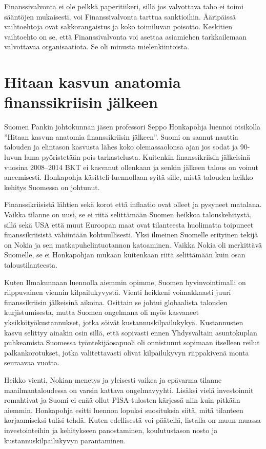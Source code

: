 \documentclass[12pt]{article}
\begin{document}
Finanssivalvonta ei ole pelkkä paperitiikeri, sillä jos valvottava taho ei toimi sääntöjen mukaisesti, voi Finanssivalvonta tarttua sanktioihin. Ääripäissä vaihtoehtoja ovat sakkorangaistus ja koko toimiluvan poisotto. Keskitien vaihtoehto on se, että Finanssivalvonta voi asettaa asiamiehen tarkkailemaan valvottavaa organisaatiota. Se oli minusta mielenkiintoista.


\newpage
\section{Hitaan kasvun anatomia finanssikriisin jälkeen}

Suomen Pankin johtokunnan jäsen professori Seppo Honkapohja luennoi otsikolla ''Hitaan kasvun anatomia finanssikriisin jälkeen''. Suomi on saanut nauttia talouden ja elintason kasvusta lähes koko olemassaolonsa ajan jos sodat ja 90-luvun lama pyöristetään pois tarkastelusta. Kuitenkin finanssikriisin jälkeisinä vuosina 2008--2014 BKT ei kasvanut ollenkaan ja senkin jälkeen talous on voinut aneemisesti. Honkapohja käsitteli luennollaan syitä sille, mistä talouden heikko kehitys Suomessa on johtunut.

Finanssikriisistä lähtien sekä korot että inflaatio ovat olleet ja pysyneet matalana. Vaikka tilanne on uusi, se ei riitä selittämään Suomen heikkoa talouskehitystä, sillä sekä USA että muut Euroopan maat ovat tilanteesta huolimatta toipuneet finanssikriisistä vähiintään kohtuullisesti. Yksi ilmeinen Suomelle erityinen tekijä on Nokia ja sen matkapuhelintuotannon katoaminen. Vaikka Nokia oli merkittävä Suomelle, se ei Honkapohjan mukaan kuitenkaan riitä selittämään kuin osan taloustilanteesta.

Kuten Ilmakunnaan luennolla aiemmin opimme, Suomen hyvinvointimalli on riippuvainen viennin kilpailukyvystä. Vienti heikkeni voimakkaasti juuri finanssikriisin jälkeisinä aikoina. Osittain se johtui globaalista talouden kurjistumisesta, mutta Suomen ongelmana oli myös kasvaneet yksikkötyökustannukset, jotka söivät kustannuskilpailukykyä. Kustannusten kasvu selittyy ainakin osin sillä, että sopivasti ennen Yhdysvaltain asuntokuplan puhkeamista Suomessa työntekijäosapuoli oli onnistunut sopimaan itselleen reilut palkankorotukset, jotka valitettavasti olivat kilpailukyvyn riippakivenä monta seuraavaa vuotta.

Heikko vienti, Nokian menetys ja yleisesti vaikea ja epävarma tilanne maailmantaloudessa on varsin kattava ongelmavyyhti. Lisäksi vielä investoinnit romahtivat ja Suomi ei enää ollut PISA-tulosten kärjessä niin kuin pitkään aiemmin. Honkapohja esitti luennon lopuksi suosituksia siitä, mitä tilanteen korjaamiseksi tulisi tehdä. Kuten edellisestä voi päätellä, listalla on muun muassa investointeihin ja kehitykseen panostaminen, koulutustason nosto ja kustannuskilpailukyvyn parantaminen.
\end{document}

